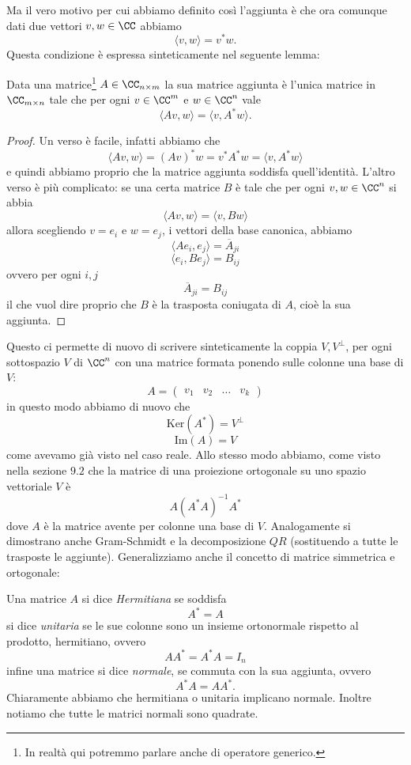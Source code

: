 \documentclass[11pt]{scrartcl}
\newcommand{\Immagine}[1]{\text{Im}\left(#1\right)}
\renewcommand{\ker}[1]{\text{Ker}\left(#1\right)}
\begin{document}
   	 Ma il vero motivo per cui abbiamo definito così l'aggiunta è che ora comunque dati due vettori $v,w\in\CC$ abbiamo
   	 $$\langle v,w\rangle = v^*w.$$
   	 Questa condizione è espressa sinteticamente nel seguente lemma:
   	 \begin{lemma}
     Data una matrice\footnote{In realtà qui potremmo parlare anche di operatore generico.}  $A\in \CC_{n\times m}$ la sua matrice aggiunta è l'unica matrice in $\CC_{m\times n}$ tale che per ogni $v\in \CC^m$ e $w\in \CC^n$ vale
   	 $$\langle Av,w\rangle = \langle v,A^*w\rangle.$$
   	 \end{lemma}
   	 \begin{proof}
   	 	Un verso è facile, infatti abbiamo che
   	 	$$\langle Av,w\rangle=\left(Av\right)^* w=v^*A^*w=\langle v,A^*w\rangle$$
   	 	e quindi abbiamo proprio che la matrice aggiunta soddisfa quell'identità. L'altro verso è più complicato: se una certa matrice $B$ è tale che per ogni $v,w\in \CC^n$ si abbia
   	 	$$\langle Av,w\rangle=\langle v,Bw\rangle$$
   	 	allora scegliendo $v=e_i$ e $w=e_j$, i vettori della base canonica, abbiamo
   	 	$$\langle Ae_i,e_j\rangle=\overline{A}_{ji}$$
   	 	$$\langle e_i,Be_j\rangle=B_{ij}$$
   	 	ovvero per ogni $i,j$ 
   	 	$$\overline{A}_{ji}=B_{ij}$$
   	 	il che vuol dire proprio che $B$ è la trasposta coniugata di $A$, cioè la sua aggiunta.
   	 \end{proof}
   	 Questo ci permette di nuovo di scrivere sinteticamente la coppia $V, V^\perp$, per ogni sottospazio $V$ di $\CC^n$ con una matrice formata ponendo sulle colonne una base di $V$: 
   	 $$A=\left(\begin{array}{c|c|c|c}
   	 	v_1 & v_2 & \dots & v_k
   	 \end{array}\right)$$
   	 in questo modo abbiamo di nuovo che
   	 $$\ker{A^*}=V^\perp$$
   	 $$\Immagine{A}=V$$
   	 come avevamo già visto nel caso reale. Allo stesso modo abbiamo, come visto nella sezione $9.2$ che la matrice di una proiezione ortogonale su uno spazio vettoriale $V$ è 
   	 $$A\left(A^* A\right)^{-1}A^*$$ 
   	 dove $A$ è la matrice avente per colonne una base di $V$. Analogamente si dimostrano anche Gram-Schmidt e la decomposizione $QR$ (sostituendo a tutte le trasposte le aggiunte). Generalizziamo anche il concetto di matrice simmetrica e ortogonale:
   	 \begin{definition}
   	 	Una matrice $A$ si dice \textit{Hermitiana} se soddisfa
   	 	$$A^*=A$$
   	 	si dice \textit{unitaria} se le sue colonne sono un insieme ortonormale rispetto al prodotto, hermitiano, ovvero
   	 	$$AA^*=A^*A=I_n$$
   	 	infine una matrice si dice \textit{normale}, se commuta con la sua aggiunta, ovvero
   	 	$$A^*A=AA^*.$$
   	 	Chiaramente abbiamo che hermitiana o unitaria implicano normale. Inoltre notiamo che tutte le matrici normali sono quadrate.
   	 \end{definition}
\end{document}
